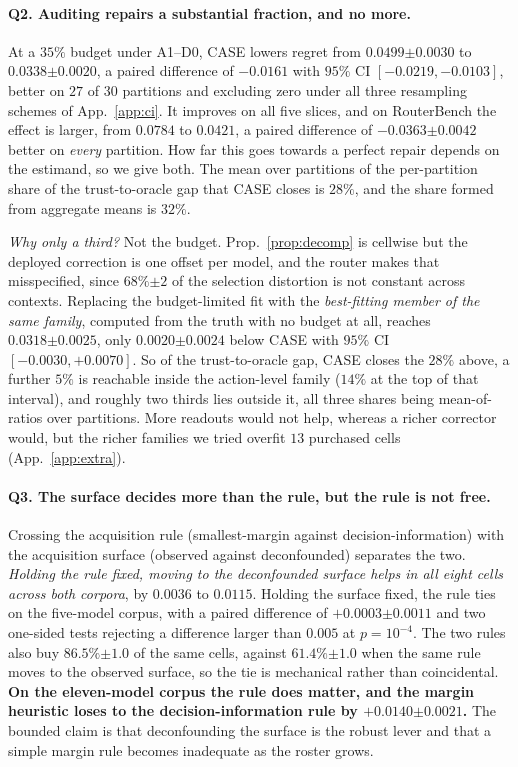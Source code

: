 \documentclass{article}
\theoremstyle{plain}
\theoremstyle{remark}
\newcommand{\se}[1]{{\scriptstyle\pm#1}}
\begin{document}
\paragraph{Q2. Auditing repairs a substantial fraction, and no more.} At a $35\%$ budget under
A1--D0, CASE lowers regret from $0.0499\se{0.0030}$ to $0.0338\se{0.0020}$, a paired difference of
$-0.0161$ with $95\%$ CI $[-0.0219,-0.0103]$, better on $27$ of $30$ partitions and excluding zero
under all three resampling schemes of App.~\ref{app:ci}. It improves on all five slices, and on
RouterBench the effect is larger, from $0.0784$ to $0.0421$, a paired difference of
$-0.0363\se{0.0042}$ better on \emph{every} partition. How far this goes towards a perfect repair
depends on the estimand, so we give both. The mean over partitions of the per-partition share of the
trust-to-oracle gap that CASE closes is $28\%$, and the share formed from aggregate means is
$32\%$.

\emph{Why only a third?} Not the budget. Prop.~\ref{prop:decomp} is cellwise but the deployed
correction is one offset per model, and the router makes that misspecified, since $68\%\se{2}$ of the
selection distortion is not constant across contexts. Replacing the budget-limited fit with the
\emph{best-fitting member of the same family}, computed from the truth with no budget at all, reaches
$0.0318\se{0.0025}$, only $0.0020\se{0.0024}$ below CASE with $95\%$ CI $[-0.0030,+0.0070]$. So of the
trust-to-oracle gap, CASE closes the $28\%$ above, a further $5\%$ is reachable inside the
action-level family ($14\%$ at the top of that interval), and roughly two thirds lies outside it, all
three shares being mean-of-ratios over partitions. More readouts would not help, whereas a richer
corrector would, but the richer families we tried overfit $13$ purchased cells
(App.~\ref{app:extra}).

\paragraph{Q3. The surface decides more than the rule, but the rule is not free.} Crossing the
acquisition rule (smallest-margin against decision-information) with the acquisition surface
(observed against deconfounded) separates the two. \emph{Holding the rule fixed, moving to the
deconfounded surface helps in all eight cells across both corpora}, by $0.0036$ to $0.0115$. Holding
the surface fixed, the rule ties on the five-model corpus, with a paired difference of
$+0.0003\se{0.0011}$ and two one-sided tests rejecting a difference larger than $0.005$ at
$p=10^{-4}$. The two rules also buy $86.5\%\se{1.0}$ of the same cells, against $61.4\%\se{1.0}$ when
the same rule moves to the observed surface, so the tie is mechanical rather than coincidental.
\textbf{On the eleven-model corpus the rule does matter, and the margin heuristic loses to the
decision-information rule by $+0.0140\se{0.0021}$.} The bounded claim is that deconfounding the
surface is the robust lever and that a simple margin rule becomes inadequate as the roster grows.
\end{document}
